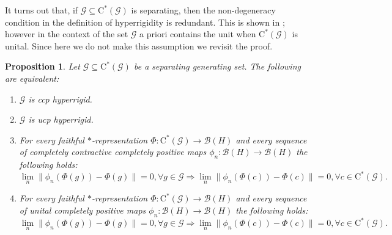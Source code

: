 \documentclass[11pt, draft]{amsart}
\numberwithin{equation}{section}
\theoremstyle{plain}
\newtheorem{proposition}[theorem]{Proposition}
\theoremstyle{definition}
\theoremstyle{remark}
\newcommand{\B}{{\mathcal{B}}}
\newcommand{\G}{{\mathcal{G}}}
\newcommand{\ca}{\mathrm{C}^*}
\begin{document}
It turns out that, if $\G\subseteq \ca(\G)$ is separating, then the non-degeneracy condition in the definition of hyperrigidity is redundant. 
This is shown in \cite[Theorem 3.9]{Sal17}; however in the context of \cite[Theorem 3.9]{Sal17} the set $\G$ a priori contains the unit when $\ca(\G)$ is unital.
Since here we do not make this assumption we revisit the proof.

\begin{proposition}\label{P:sephyp} \cite[Theorem 3.9]{Sal17}
Let $\G\subseteq \ca(\G)$ be a separating generating set. 
The following are equivalent:
\begin{enumerate}
\item $\G$ is ccp hyperrigid.
\item $\G$ is ucp hyperrigid.
\item For every faithful $*$-representation $\Phi \colon \ca(\G) \to \B(H)$ and every sequence of completely contractive completely positive maps $\phi_n \colon \B(H) \to \B(H)$ the following holds:
\[
\lim_n \|\phi_n(\Phi(g)) - \Phi(g)\|=0, \forall g \in \G
\Rightarrow
\lim_n \|\phi_n(\Phi(c)) - \Phi(c)\| = 0, \forall c \in \ca(\G).
\]
\item For every faithful $*$-representation $\Phi \colon \ca(\G) \to \B(H)$ and every sequence of unital completely positive maps $\phi_n \colon \B(H) \to \B(H)$ the following holds:
\[
\lim_n \|\phi_n(\Phi(g)) - \Phi(g)\|=0, \forall g \in \G
\Rightarrow
\lim_n \|\phi_n(\Phi(c)) - \Phi(c)\| = 0, \forall c \in \ca(\G).
\]
\end{enumerate}
\end{proposition}
\end{document}
